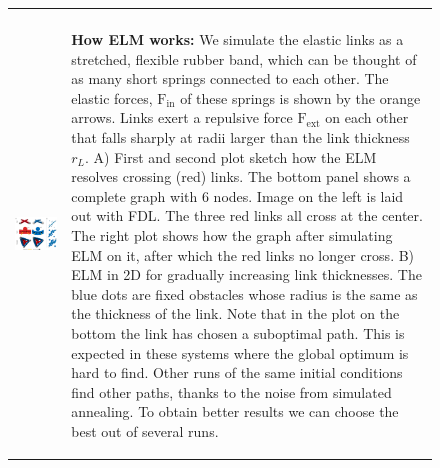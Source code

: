 \documentclass[nofootinbib,preprint,floatfix,titlepage,endfloats]{revtex4} %
\begin{document}
{\begin{figure}
\begin{tabular}{ll}
\begin{minipage}{.3\textwidth}
\begin{spacing}{.5}
        \end{spacing}
          \end{minipage}
         \\
         \begin{minipage}{.7\columnwidth}
    \includegraphics[width = \columnwidth]{fig-09-19/elf-resolve-2d-1.png}
    \end{minipage}
         & 
         \begin{minipage}{.3\columnwidth}
         \raggedright
         \begin{spacing}{.5}
         {\scriptsize{\bf How ELM works:} We simulate the elastic links as a stretched, flexible rubber band, which can be thought of as many short springs connected to each other. The elastic forces, $\mathrm{F}_{\mathrm{in}}$ of these springs is shown by the orange arrows. Links exert a repulsive force $\mathrm{F}_{\mathrm{ext}}$  on each other that falls sharply at radii larger than the link thickness $r_L$. A) First and second plot sketch how the ELM resolves crossing (red) links. The bottom panel shows a complete graph with 6 nodes. Image on the left is laid out with FDL. The three red links all cross at the center. The right plot shows how the graph after simulating ELM on it, after which the red links no longer cross. B) ELM in 2D for gradually increasing link thicknesses. The blue dots are fixed obstacles whose radius is the same as the thickness of the link. Note that in the plot on the bottom the link has chosen a suboptimal path. This is  expected in these systems where the global optimum is hard to find. Other runs of the same initial conditions find other paths, thanks to the noise from simulated annealing. To obtain better results we can choose the best out of several runs.}
         
        \end{spacing}
    \end{minipage}
    \end{tabular}
    \label{fig:crossings}
\end{figure}




} %
\end{document}
